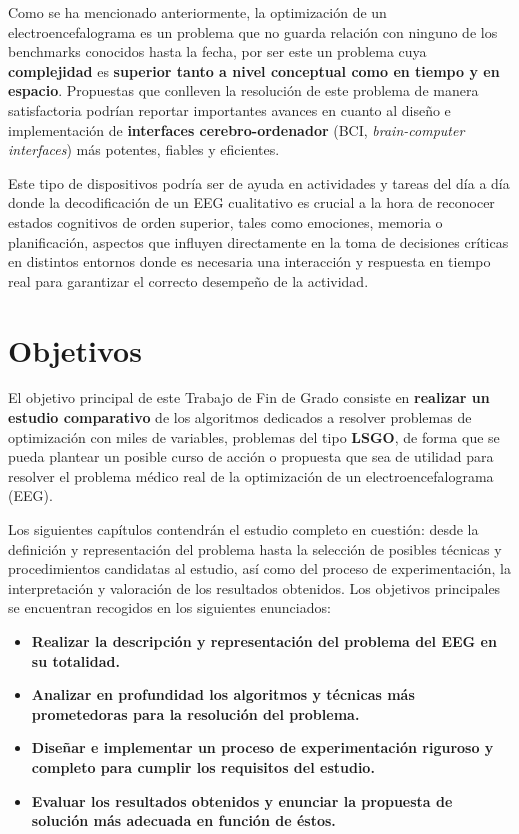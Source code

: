 Como se ha mencionado anteriormente, la optimización de un electroencefalograma es un problema que no guarda relación con ninguno de los benchmarks conocidos hasta la fecha, por ser este un problema cuya \textbf{complejidad} es \textbf{superior tanto a nivel conceptual como en tiempo y en espacio}. Propuestas que conlleven la resolución de este problema de manera satisfactoria podrían reportar importantes avances en cuanto al diseño e implementación de \textbf{interfaces cerebro-ordenador} (BCI, \textit{brain-computer interfaces}) más potentes, fiables y eficientes.

Este tipo de dispositivos podría ser de ayuda en actividades y tareas del día a día donde la decodificación de un EEG cualitativo es crucial a la hora de reconocer estados cognitivos de orden superior, tales como emociones, memoria o planificación, aspectos que influyen directamente en la toma de decisiones críticas\cite{EvolutionaryBigOpt} en distintos entornos donde es necesaria una interacción y respuesta en tiempo real para garantizar el correcto desempeño de la actividad.

\section{Objetivos}

El objetivo principal de este Trabajo de Fin de Grado consiste en \textbf{realizar un estudio comparativo} de los algoritmos dedicados a resolver problemas de optimización con miles de variables, problemas del tipo \textbf{LSGO}, de forma que se pueda plantear un posible curso de acción o propuesta que sea de utilidad para resolver el problema médico real de la optimización de un electroencefalograma (EEG).

Los siguientes capítulos contendrán el estudio completo en cuestión: desde la definición y representación del problema hasta la selección de posibles técnicas y procedimientos candidatas al estudio, así como del proceso de experimentación, la interpretación y valoración de los resultados obtenidos. Los objetivos principales se encuentran recogidos en los siguientes enunciados:

\begin{itemize}
	\item \textbf{Realizar la descripción y representación del problema del EEG en su totalidad.}
	\item \textbf{Analizar en profundidad los algoritmos y técnicas más prometedoras para la resolución del problema.}
	\item \textbf{Diseñar e implementar un proceso de experimentación riguroso y completo para cumplir los requisitos del estudio.}
	\item \textbf{Evaluar los resultados obtenidos y enunciar la propuesta de solución más adecuada en función de éstos.}
\end{itemize}

